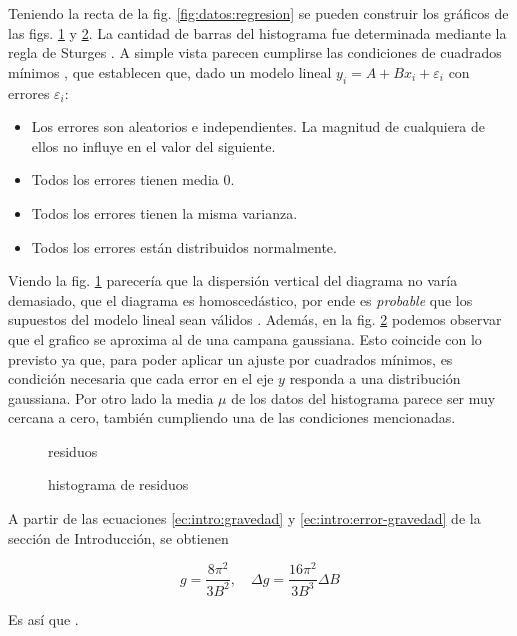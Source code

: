 Teniendo la recta de la fig. \ref{fig:datos:regresion} se pueden construir los
gráficos de las figs. \ref{fig:datos:residuos} y \ref{fig:datos:histograma}.
La cantidad de barras del histograma fue determinada mediante la regla de 
Sturges \cite{sturges}.
A simple vista parecen cumplirse las condiciones de cuadrados mínimos 
\cite[pág. 527]{estadistica}, que establecen que, dado un modelo lineal
$y_i = A + Bx_i + \varepsilon_i$ con errores $\varepsilon_i$:

\begin{itemize}
    \item Los errores son aleatorios e independientes. La magnitud de 
        cualquiera de ellos no influye en el valor del siguiente.
    \item Todos los errores tienen media 0.
    \item Todos los errores tienen la misma varianza.
    \item Todos los errores están distribuidos normalmente.
\end{itemize}

Viendo la fig. \ref{fig:datos:residuos} parecería que la dispersión vertical
del diagrama no varía demasiado, que el diagrama es homoscedástico, por ende
es \textit{probable} que los supuestos del modelo lineal sean válidos
\cite[págs. 527-528]{estadistica}. Además, en la fig.
\ref{fig:datos:histograma} podemos observar que el grafico se aproxima al
de una campana gaussiana. Esto coincide con lo previsto ya que, para poder
aplicar un ajuste por cuadrados mínimos, es condición necesaria que cada
error en el eje $y$ responda a una distribución gaussiana. Por otro lado la
media $\mu$ de los datos del histograma parece ser muy cercana a cero, también cumpliendo una de las condiciones mencionadas.

\begin{figure}[H]
    \centering
    
    \caption{residuos}
    \label{fig:datos:residuos}
\end{figure}

\begin{figure}[H]
    \centering
    
    \caption{histograma de residuos}
    \label{fig:datos:histograma}
\end{figure}

A partir de las ecuaciones \ref{ec:intro:gravedad} y
\ref{ec:intro:error-gravedad} de la sección de Introducción, se
obtienen

\[
    g = \frac{8\pi^2}{3B^2}, \quad \Delta g = \frac{16\pi^2}{3B^3} \Delta B
\]

Es así que .
